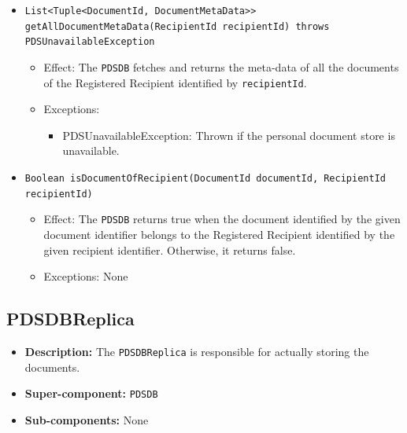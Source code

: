 \documentclass[a4paper,10pt]{article}
\begin{document}
\begin{itemize}
\begin{itemize}
         \item \texttt{List<Tuple<DocumentId, DocumentMetaData>> getAllDocumentMetaData(RecipientId recipientId) throws PDSUnavailableException}
        \begin{itemize}
            \item Effect: The \texttt{PDSDB} fetches and returns the meta-data of all the documents of the Registered Recipient identified by \texttt{recipientId}.
            \item Exceptions:
            \begin{itemize}
                \item PDSUnavailableException: Thrown if the personal document store is unavailable.
            \end{itemize}
		\end{itemize}
		
		 \item \texttt{Boolean isDocumentOfRecipient(DocumentId documentId, RecipientId recipientId)}
        \begin{itemize}
            \item Effect: The \texttt{PDSDB} returns true when the document identified by the given document identifier belongs to the Registered Recipient identified by the given recipient identifier. Otherwise, it returns false.
            \item Exceptions: None
		\end{itemize}
		
		
    \end{itemize}
\end{itemize}

\subsection{PDSDBReplica}
\begin{itemize}
    \item \textbf{Description:} The \texttt{PDSDBReplica} is responsible for actually storing the documents.
    \item \textbf{Super-component:} \texttt{PDSDB}
    \item \textbf{Sub-components:} None
\end{itemize}
\end{document}
